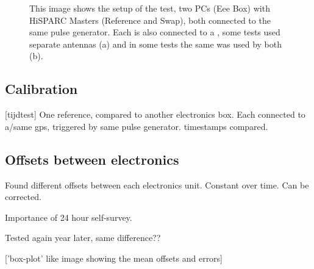 \begin{figure}
    \centering
    
    \caption{This image shows the setup of the test, two PCs (Eee Box)
             with HiSPARC Masters (Reference and Swap), both connected
             to the same pulse generator. Each is also connected to a
             \gps, some tests used separate \gps antennas (a) and in
             some tests the same \gps was used by both (b).}
    \label{fig:setup}
\end{figure}


\subsection{Calibration}
\label{sub:gps_calibration}

[tijdtest]
One reference, compared to another \hisparc electronics box.
Each connected to a/same gps, triggered by same pulse generator.
\gps timestamps compared.


\subsection{Offsets between \hisparc electronics}
\label{sub:gps_offsets}

Found different offsets between each \hisparc electronics unit.
Constant over time. Can be corrected.

Importance of 24 hour self-survey.

Tested again year later, same difference??

['box-plot' like image showing the mean offsets and errors]

